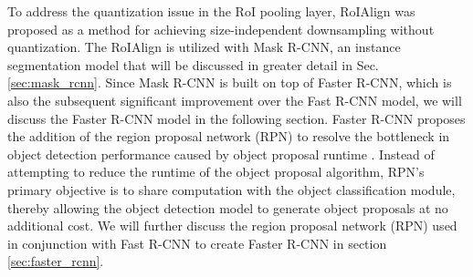 To address the quantization issue in the RoI pooling layer, RoIAlign was proposed as a method for achieving size-independent downsampling without quantization. The RoIAlign is utilized with Mask R-CNN, an instance segmentation model that will be discussed in greater detail in Sec. \ref{sec:mask_rcnn}. Since Mask R-CNN is built on top of Faster R-CNN, which is also the subsequent significant improvement over the Fast R-CNN model, we will discuss the Faster R-CNN model in the following section. Faster R-CNN proposes the addition of the region proposal network (RPN) to resolve the bottleneck in object detection performance caused by object proposal runtime \cite{faster_rcnn_2015}. Instead of attempting to reduce the runtime of the object proposal algorithm, RPN's primary objective is to share computation with the object classification module, thereby allowing the object detection model to generate object proposals at no additional cost. We will further discuss the region proposal network (RPN) used in conjunction with Fast R-CNN to create Faster R-CNN in section \ref{sec:faster_rcnn}.